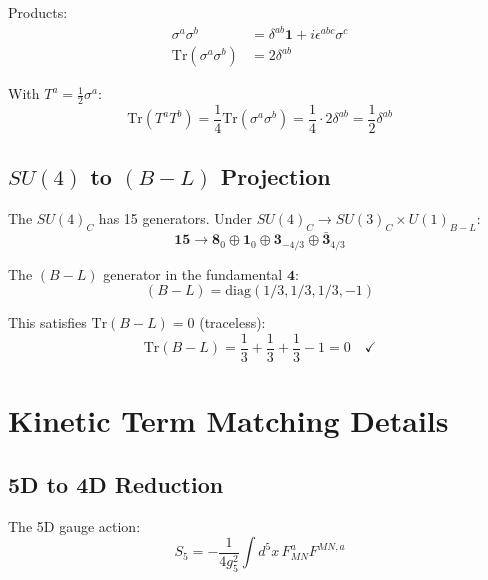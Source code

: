 \documentclass[11pt,a4paper]{article}
\begin{document}
Products:
\begin{align}
\label{eq:pauli-product}
\sigma^a \sigma^b &= \delta^{ab} \mathbf{1} + i \epsilon^{abc} \sigma^c \\
\label{eq:pauli-trace}
\mathrm{Tr}(\sigma^a \sigma^b) &= 2 \delta^{ab}
\end{align}

With $T^a = \frac{1}{2}\sigma^a$:
\begin{equation}
\label{eq:t-trace-derive}
\mathrm{Tr}(T^a T^b) = \frac{1}{4} \mathrm{Tr}(\sigma^a \sigma^b) = \frac{1}{4} \cdot 2 \delta^{ab} = \frac{1}{2} \delta^{ab}
\end{equation}

\subsection{$SU(4)$ to $(B-L)$ Projection}
\label{app:su4-bl}

The $SU(4)_C$ has 15 generators. Under $SU(4)_C \to SU(3)_C \times U(1)_{B-L}$:
\begin{equation}
\label{eq:su4-decomp}
\mathbf{15} \to \mathbf{8}_0 \oplus \mathbf{1}_0 \oplus \mathbf{3}_{-4/3} \oplus \bar{\mathbf{3}}_{4/3}
\end{equation}

The $(B-L)$ generator in the fundamental $\mathbf{4}$:
\begin{equation}
\label{eq:bl-4}
(B-L) = \text{diag}(1/3, 1/3, 1/3, -1)
\end{equation}

This satisfies $\mathrm{Tr}(B-L) = 0$ (traceless):
\begin{equation}
\label{eq:bl-traceless}
\mathrm{Tr}(B-L) = \frac{1}{3} + \frac{1}{3} + \frac{1}{3} - 1 = 0 \quad \checkmark
\end{equation}

\section{Kinetic Term Matching Details}
\label{app:kinetic}

\subsection{5D to 4D Reduction}
\label{app:5d-4d}

The 5D gauge action:
\begin{equation}
\label{eq:5d-action}
S_5 = -\frac{1}{4g_5^2} \int d^5x \, F_{MN}^a F^{MN,a}
\end{equation}
\end{document}
